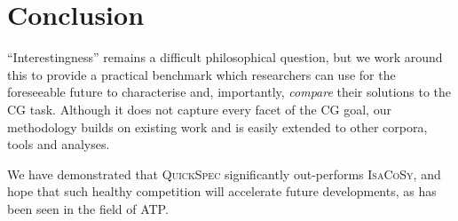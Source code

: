 \documentclass[]{default}
\begin{document}
\section{Conclusion}

``Interestingness'' remains a difficult philosophical question, but we work
around this to provide a practical benchmark which researchers can use for the
foreseeable future to characterise and, importantly, \emph{compare} their
solutions to the CG task. Although it does not capture every facet of the CG
goal, our methodology builds on existing work and is easily extended to other
corpora, tools and analyses.

We have demonstrated that \textsc{QuickSpec} significantly out-performs
\textsc{IsaCoSy}, and hope that such healthy competition will accelerate future
developments, as has been seen in the field of ATP.



\end{document}
